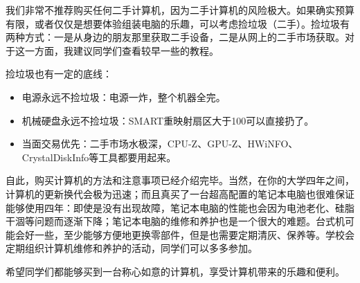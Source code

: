 \documentclass[../main.tex]{subfiles}
\begin{document}
我们非常不推荐购买任何二手计算机，因为二手计算机的风险极大。如果确实预算有限，或者仅仅是想要体验组装电脑的乐趣，可以考虑捡垃圾（二手）。捡垃圾有两种方式：一是从身边的朋友那里获取二手设备，二是从网上的二手市场获取。对于这一方面，我建议同学们查看较早一些的教程。

捡垃圾也有一定的底线：
\begin{itemize}
  \item 电源永远不捡垃圾：电源一炸，整个机器全完。
  \item 机械硬盘永远不捡垃圾：SMART重映射扇区大于100可以直接扔了。
  \item 当面交易优先：二手市场水极深，CPU-Z、GPU-Z、HWiNFO、CrystalDiskInfo等工具都要用起来。
\end{itemize}

自此，购买计算机的方法和注意事项已经介绍完毕。当然，在你的大学四年之间，计算机的更新换代会极为迅速；而且真买了一台超高配置的笔记本电脑也很难保证能够使用四年：即使是没有出现故障，笔记本电脑的性能也会因为电池老化、硅脂干涸等问题而逐渐下降；笔记本电脑的维修和养护也是一个很大的难题。台式机可能会好一些，至少能够方便地更换零部件，但是也需要定期清灰、保养等。学校会定期组织计算机维修和养护的活动，同学们可以多多参加。

希望同学们都能够买到一台称心如意的计算机，享受计算机带来的乐趣和便利。
\end{document}
